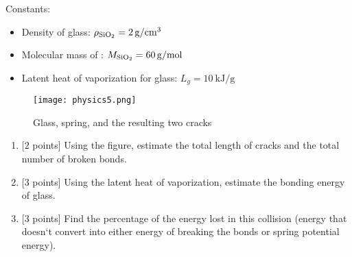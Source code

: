 \begin{enumerate}[align=left,start=1,label=\textbf{\textcolor{meared}{Problem \arabic*}}]
        Constants:
        \begin{itemize}
            \item Density of glass: $\rho_{\ce{SiO_2}} = \qty[per-mode = symbol]{2}{\gram\per\centi\meter\tothe{3}}$
            \item Molecular mass of : $M_{\ce{SiO_2}} = \qty[per-mode = symbol]{60}{\gram\per\mole}$
            \item Latent heat of vaporization for glass: $L_g = \qty[per-mode = symbol]{10}{\kilo\joule\per\gram}$
        \end{itemize}

        \begin{figure}[!ht]
            \centering
            \texttt{[image: physics5.png]}
            \caption{Glass, spring, and the resulting two cracks}
        \end{figure}

        \begin{enumerate}
            \item {[$2$ points]} Using the figure, estimate the total length of cracks and the total number of broken bonds.
            \item {[$3$ points]} Using the latent heat of vaporization, estimate the bonding energy of glass.
            \item {[$3$ points]} Find the percentage of the energy lost in this collision (energy that doesn`t convert into either energy of breaking the bonds or spring potential energy).
        \end{enumerate}
\end{enumerate}

